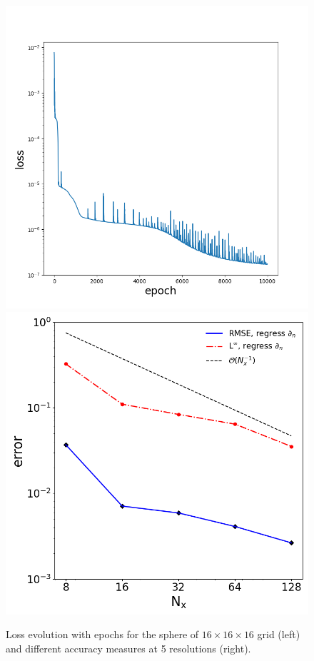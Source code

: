 \documentclass{elsarticle}
\begin{document}
\begin{figure}
	\centering
	\includegraphics[width=0.49\linewidth]{./figures/poisson_solver_loss_sphere_128x128x128.png}
	\includegraphics[width=0.45\linewidth]{./figures/case_I_regression.png}
	\caption{Loss evolution with epochs for the sphere of $16\times 16\times 16$ grid (left) and different accuracy measures at 5 resolutions (right).}
	\label{fig:losses}
\end{figure}
\end{document}
